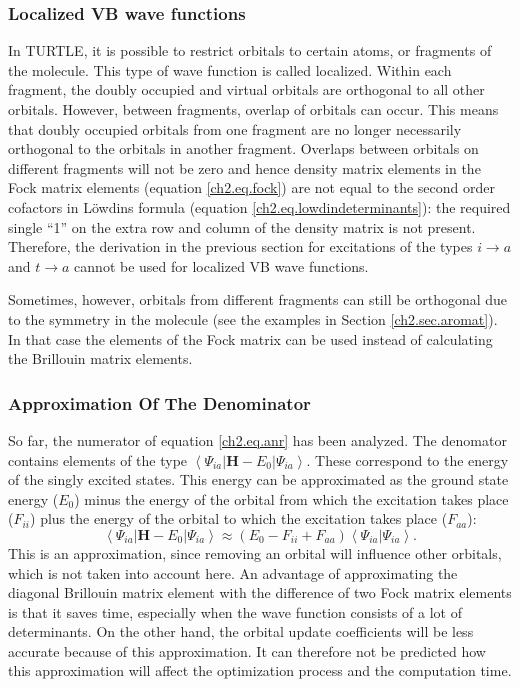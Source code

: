\subsubsection{\label{ch2.sec.delocal}Localized VB wave functions}

In TURTLE, it is possible to restrict orbitals to certain atoms, or fragments of the molecule. This type of wave function is called localized. Within each fragment, the doubly occupied and virtual orbitals are orthogonal to all other orbitals. However, between fragments, overlap of orbitals can occur. This means that doubly occupied orbitals from one fragment are no longer necessarily orthogonal to the orbitals in another fragment. Overlaps between orbitals on different fragments will not be zero and hence density matrix elements in the Fock matrix elements (equation \ref{ch2.eq.fock}) are not equal to the second order cofactors in L\"{o}wdins formula (equation \ref{ch2.eq.lowdindeterminants}): the required single ``1'' on the extra row and column of the density matrix is not present. Therefore, the derivation in the previous section for excitations of the types $i \rightarrow a$ and $t \rightarrow a$ cannot be used for localized VB wave functions. 

Sometimes, however, orbitals from different fragments can still be orthogonal due to the symmetry in the molecule (see the examples in Section \ref{ch2.sec.aromat}). In that case the elements of the Fock matrix can be used instead of calculating the Brillouin matrix elements.

\subsubsection{\label{ch2.sec.denominator}Approximation Of The Denominator}

So far, the numerator of equation \ref{ch2.eq.anr} has been analyzed. The denomator contains elements of the type $\left< \Psi_{ia} | \mathbf{H}-E_0 | \Psi_{ia} \right>$. These correspond to the energy of the singly excited states. This energy can be approximated as the ground state energy ($E_0$) minus the energy of the orbital from which the excitation takes place ($F_{ii}$) plus the energy of the orbital to which the excitation takes place ($F_{aa}$):
\begin{equation}
\left< \Psi_{ia} | \mathbf{H}-E_0 | \Psi_{ia} \right> \approx (E_0 - F_{ii} + F_{aa})\left< \Psi_{ia} | \Psi_{ia} \right>.
\label{ch2.eq.cheapdiag}
\end{equation}
This is an approximation, since removing an orbital will influence other orbitals, which is not taken into account here. An advantage of approximating the diagonal Brillouin matrix element with the difference of two Fock matrix elements is that it saves time, especially when the wave function consists of a lot of determinants. On the other hand, the orbital update coefficients will be less accurate because of this approximation. It can therefore not be predicted how this approximation will affect the optimization process and the computation time.

